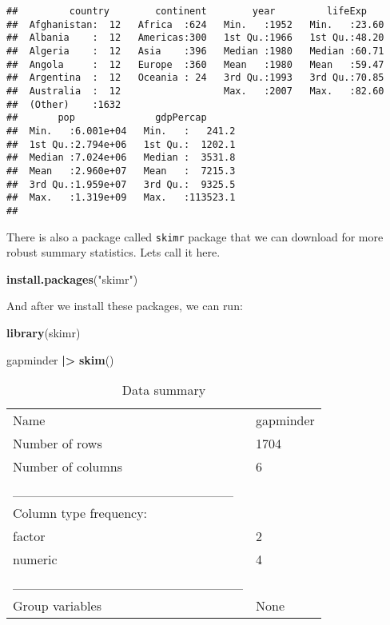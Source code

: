 \documentclass[
]{article}
\newenvironment{Shaded}{\begin{snugshade}}{\end{snugshade}}
\newcommand{\FunctionTok}[1]{\textcolor[rgb]{0.13,0.29,0.53}{\textbf{#1}}}
\newcommand{\NormalTok}[1]{#1}
\newcommand{\SpecialCharTok}[1]{\textcolor[rgb]{0.81,0.36,0.00}{\textbf{#1}}}
\newcommand{\StringTok}[1]{\textcolor[rgb]{0.31,0.60,0.02}{#1}}
\begin{document}
\begin{verbatim}
##         country        continent        year         lifeExp     
##  Afghanistan:  12   Africa  :624   Min.   :1952   Min.   :23.60  
##  Albania    :  12   Americas:300   1st Qu.:1966   1st Qu.:48.20  
##  Algeria    :  12   Asia    :396   Median :1980   Median :60.71  
##  Angola     :  12   Europe  :360   Mean   :1980   Mean   :59.47  
##  Argentina  :  12   Oceania : 24   3rd Qu.:1993   3rd Qu.:70.85  
##  Australia  :  12                  Max.   :2007   Max.   :82.60  
##  (Other)    :1632                                                
##       pop              gdpPercap       
##  Min.   :6.001e+04   Min.   :   241.2  
##  1st Qu.:2.794e+06   1st Qu.:  1202.1  
##  Median :7.024e+06   Median :  3531.8  
##  Mean   :2.960e+07   Mean   :  7215.3  
##  3rd Qu.:1.959e+07   3rd Qu.:  9325.5  
##  Max.   :1.319e+09   Max.   :113523.1  
## 
\end{verbatim}

There is also a package called \texttt{skimr} package that we can
download for more robust summary statistics. Lets call it here.

\begin{Shaded}
\begin{Highlighting}[]
\FunctionTok{install.packages}\NormalTok{(}\StringTok{"skimr"}\NormalTok{)}
\end{Highlighting}
\end{Shaded}

And after we install these packages, we can run:

\begin{Shaded}
\begin{Highlighting}[]
\FunctionTok{library}\NormalTok{(skimr)}

\NormalTok{gapminder }\SpecialCharTok{|\textgreater{}}  
  \FunctionTok{skim}\NormalTok{()}
\end{Highlighting}
\end{Shaded}

\begin{longtable}[]{@{}ll@{}}
\caption{Data summary}\tabularnewline
\toprule\noalign{}
\endfirsthead
\endhead
\bottomrule\noalign{}
\endlastfoot
Name & gapminder \\
Number of rows & 1704 \\
Number of columns & 6 \\
\_\_\_\_\_\_\_\_\_\_\_\_\_\_\_\_\_\_\_\_\_\_\_ & \\
Column type frequency: & \\
factor & 2 \\
numeric & 4 \\
\_\_\_\_\_\_\_\_\_\_\_\_\_\_\_\_\_\_\_\_\_\_\_\_ & \\
Group variables & None \\
\end{longtable}
\end{document}
